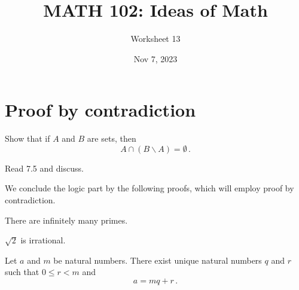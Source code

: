\documentclass[12pt]{amsart}
\title{ MATH 102: Ideas  of Math }
\author{ Worksheet 13 }
\date{Nov 7, 2023}
\begin{document}
\maketitle
\section*{Proof by contradiction}


\begin{problem}
Show that if $A$ and $B$ are sets, then
\begin{equation*}
	A \cap (B\backslash A) = \emptyset \,.
\end{equation*}
\end{problem}
\vspace{5cm}

\begin{problem}
Read 7.5 and discuss.
\end{problem}
\vspace{5cm}




We conclude the logic part by the following proofs, which will
employ proof by contradiction.
\begin{theorem}
	There are infinitely many primes.
\end{theorem}

\vspace{7cm}

\begin{theorem}
	$\sqrt{2}$ is irrational.
\end{theorem}

\vspace{7cm}

\begin{theorem}
	Let $a$ and $m$ be natural numbers. There exist unique
	natural numbers $q$ and $r$ such that $0 \leq r <m$ and
	$$ a = mq + r\,.$$
\end{theorem}
\end{document}
